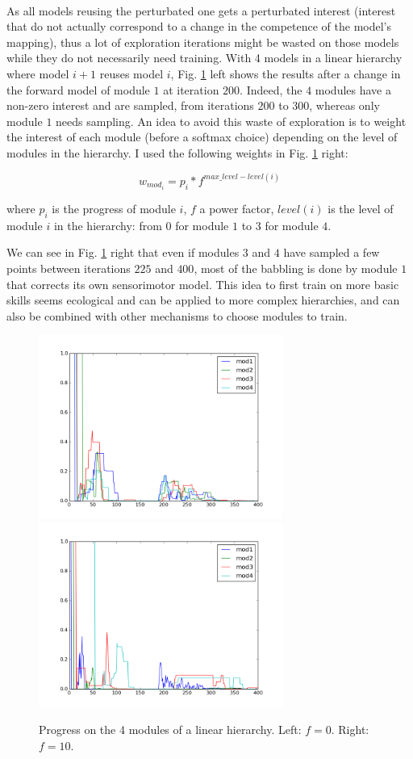 \documentclass[12pt]{article}
\begin{document}
		\paragraph{}
		As all models reusing the perturbated one gets a perturbated interest (interest that do not actually correspond to a change in the competence of the model's mapping), thus a lot of exploration iterations might be wasted
		on those models while they do not necessarily need training.
		With 4 models in a linear hierarchy where model $i+1$ reuses model $i$, Fig. \ref{f10} left shows the results after a change in the forward model of module $1$ at iteration $200$.
		Indeed, the $4$ modules have a non-zero interest and are sampled, from iterations $200$ to $300$, whereas only module $1$ needs sampling.
		An idea to avoid this waste of exploration is to weight the interest of each module (before a softmax choice) depending on the level of modules in the hierarchy.
		I used the following weights in Fig. \ref{f10} right: 
		
		$$ w_{mod_i} = p_i * f^{max\_level - level(i)}$$
		
		where $p_i$ is the progress of module $i$, $f$ a power factor, $level(i)$ is the level of module $i$ in the hierarchy: from $0$ for module $1$ to $3$ for module $4$.
		
		We can see in Fig. \ref{f10} right that even if modules $3$ and $4$ have sampled a few points between iterations $225$ and $400$, most of the babbling is done by module $1$ that corrects its own sensorimotor model.
		This idea to first train on more basic skills seems ecological and can be applied to more complex hierarchies, and can also be combined with other mechanisms to choose modules to train.
		
		
		\begin{figure}[H]
			\centering
			\includegraphics[width=8cm]{./include/NSLWLR-f=0.png}
			\includegraphics[width=8cm]{./include/NSLWLR-f=10.png}
			\caption{Progress on the 4 modules of a linear hierarchy. Left: $f=0$. Right: $f=10$.}
			\label{f10}
		\end{figure}
		
\end{document}
